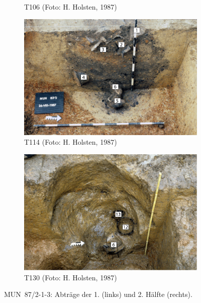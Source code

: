 \begin{figure}[p]
\begin{subfigure}[t]{\columnwidth}
		\caption{T106 (Foto: H. Holsten, 1987)}
		\label{fig:MUN87-213_T106_H87-06-15}
	\end{subfigure}
	\begin{subfigure}[t]{\columnwidth}
		\includegraphics[width = \textwidth]{fig/MUN87-213_T114_H87-06-6.pdf}
		\caption{T114 (Foto: H. Holsten, 1987)}
		\label{fig:MUN87-213_T114_H87-06-6}
	\end{subfigure}\hfill
	\begin{subfigure}[t]{\columnwidth}
		\includegraphics[width = \textwidth]{fig/MUN87-213_T130_H87-06-20.pdf}
		\caption{T130 (Foto: H. Holsten, 1987)}
		\label{fig:MUN87-213_T130_H87-06-20}
	\end{subfigure}	\caption{MUN~87/2-1-3: Abträge der 1. (links) und 2. Hälfte (rechts).}
	\label{fig:MUN87.2-1-3_Plana_Fotos}
\end{figure}

